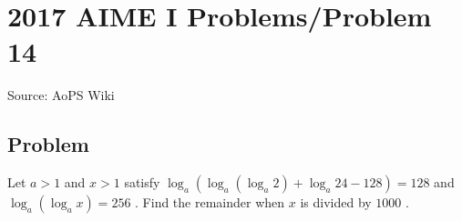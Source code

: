 \documentclass[12pt]{article}
\begin{document}
\section*{{2017 AIME I Problems/Problem 14}}
Source: AoPS Wiki

\subsection*{Problem}
Let $a > 1$ and $x > 1$ satisfy $\log_a(\log_a(\log_a 2) + \log_a 24 - 128) = 128$ and $\log_a(\log_a x) = 256$ . Find the remainder when $x$ is divided by $1000$ .
\end{document}
